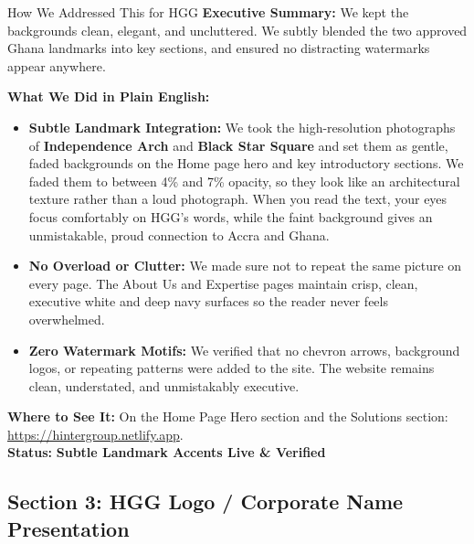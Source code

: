 \documentclass[11pt,a4paper]{article}
\begin{document}
\begin{DetailedResolutionBox}{How We Addressed This for HGG}
\textbf{Executive Summary:} We kept the backgrounds clean, elegant, and uncluttered. We subtly blended the two approved Ghana landmarks into key sections, and ensured no distracting watermarks appear anywhere.

\textbf{What We Did in Plain English:}
\begin{itemize}
    \item \textbf{Subtle Landmark Integration:} We took the high-resolution photographs of \textbf{Independence Arch} and \textbf{Black Star Square} and set them as gentle, faded backgrounds on the Home page hero and key introductory sections. We faded them to between 4\% and 7\% opacity, so they look like an architectural texture rather than a loud photograph. When you read the text, your eyes focus comfortably on HGG's words, while the faint background gives an unmistakable, proud connection to Accra and Ghana.
    \item \textbf{No Overload or Clutter:} We made sure not to repeat the same picture on every page. The About Us and Expertise pages maintain crisp, clean, executive white and deep navy surfaces so the reader never feels overwhelmed.
    \item \textbf{Zero Watermark Motifs:} We verified that no chevron arrows, background logos, or repeating patterns were added to the site. The website remains clean, understated, and unmistakably executive.
\end{itemize}

\textbf{Where to See It:} On the Home Page Hero section and the Solutions section: \url{https://hintergroup.netlify.app}. \\
\textbf{Status:} \textcolor{HGGGreen}{\textbf{Subtle Landmark Accents Live \& Verified}}
\end{DetailedResolutionBox}

\vspace{0.3cm}

\subsection{Section 3: HGG Logo / Corporate Name Presentation}
\end{document}
